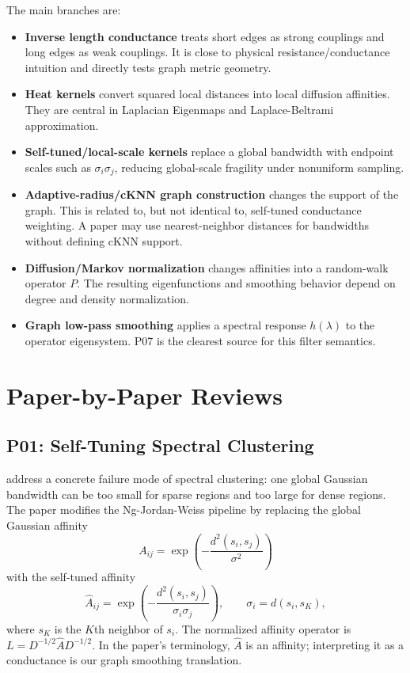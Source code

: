 \documentclass[11pt]{article}
\begin{document}
The main branches are:
\begin{itemize}
  \item \textbf{Inverse length conductance} treats short edges as strong
    couplings and long edges as weak couplings.  It is close to physical
    resistance/conductance intuition and directly tests graph metric geometry.
  \item \textbf{Heat kernels} convert squared local distances into local
    diffusion affinities.  They are central in Laplacian Eigenmaps and
    Laplace-Beltrami approximation.
  \item \textbf{Self-tuned/local-scale kernels} replace a global bandwidth with
    endpoint scales such as \(\sigma_i\sigma_j\), reducing global-scale
    fragility under nonuniform sampling.
  \item \textbf{Adaptive-radius/cKNN graph construction} changes the support of
    the graph.  This is related to, but not identical to, self-tuned
    conductance weighting.  A paper may use nearest-neighbor distances for
    bandwidths without defining cKNN support.
  \item \textbf{Diffusion/Markov normalization} changes affinities into a
    random-walk operator \(P\).  The resulting eigenfunctions and smoothing
    behavior depend on degree and density normalization.
  \item \textbf{Graph low-pass smoothing} applies a spectral response
    \(h(\lambda)\) to the operator eigensystem.  P07 is the clearest source for
    this filter semantics.
\end{itemize}

\section{Paper-by-Paper Reviews}

\subsection{P01: Self-Tuning Spectral Clustering}

\citet{zelnikmanor2004selftuning} address a concrete failure mode of spectral
clustering: one global Gaussian bandwidth can be too small for sparse regions
and too large for dense regions.  The paper modifies the Ng-Jordan-Weiss
pipeline by replacing the global Gaussian affinity
\[
  A_{ij}=\exp\left(-\frac{d^2(s_i,s_j)}{\sigma^2}\right)
\]
with the self-tuned affinity
\[
  \hat A_{ij}=
  \exp\left(-\frac{d^2(s_i,s_j)}{\sigma_i\sigma_j}\right),
  \qquad
  \sigma_i=d(s_i,s_K),
\]
where \(s_K\) is the \(K\)th neighbor of \(s_i\).  The normalized affinity
operator is \(L=D^{-1/2}\hat A D^{-1/2}\).  In the paper's terminology,
\(\hat A\) is an affinity; interpreting it as a conductance is our graph
smoothing translation.
\end{document}
